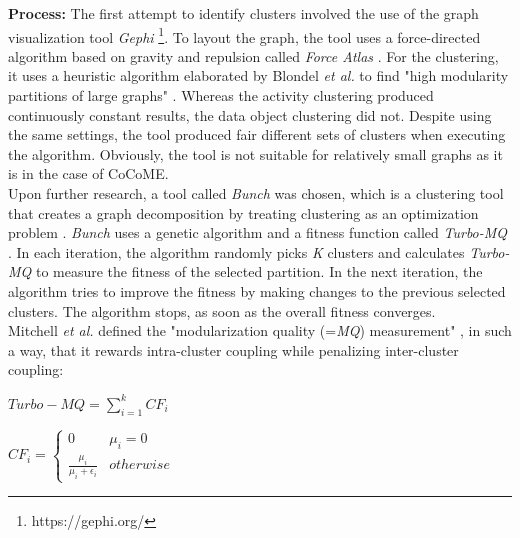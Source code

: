\noindent
\textbf{Process:} The first attempt to identify clusters involved the use of the graph visualization tool \textit{Gephi} \footnote{https://gephi.org/}. To layout the graph, the tool uses a force-directed algorithm based on gravity and repulsion called \textit{Force Atlas} \cite{gephi}. For the clustering, it uses a heuristic algorithm elaborated by Blondel \textit{et al.} to find "high modularity partitions of large graphs" \cite{modularity}. Whereas the activity clustering produced continuously constant results, the data object clustering did not. Despite using the same settings, the tool produced fair different sets of clusters when executing the algorithm. Obviously, the tool is not suitable for relatively small graphs as it is in the case of CoCoME.  \\
Upon further research, a tool called \textit{Bunch} was chosen, which is a clustering tool that creates a graph decomposition by treating clustering as an optimization problem \cite{bunch}. \textit{Bunch} uses a genetic algorithm and a fitness function called \textit{Turbo-MQ} \cite{turbo-MQ}. In each iteration, the algorithm randomly picks \textit{K} clusters and calculates \textit{Turbo-MQ} to measure the fitness of the selected partition. In the next iteration, the algorithm tries to improve the fitness by making changes to the previous selected clusters. The algorithm stops, as soon as the overall fitness converges.\\



\noindent
Mitchell \textit{et al.} defined the "modularization quality (=\textit{MQ}) measurement" \cite{turbo-MQ}, in such a way, that it rewards intra-cluster coupling while penalizing inter-cluster coupling:

\vspace{1cm}
\noindent
\begin{minipage}{.4\linewidth}
	
	\flushleft
	\begin{math}
	  Turbo-MQ = \sum_{i=1}^{k} CF_{i} 
	\end{math}
	

\end{minipage}%
\begin{minipage}{.5\linewidth}
	\flushleft
	\begin{math}
      CF_{i} = \begin{cases}
       0 & \mu_{i} = 0 \\
        \frac{\mu_{i}}{\mu_{i} + \epsilon_{i}}  & otherwise
      \end{cases}
  \end{math}


\end{minipage}
\vspace{1cm}

